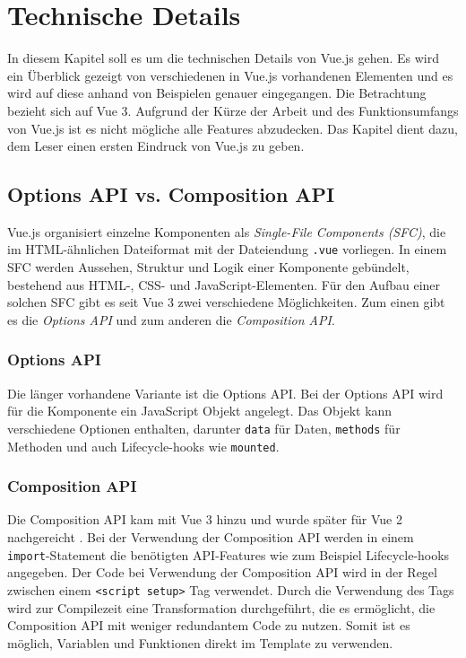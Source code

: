 

\chapter{Technische Details}\label{ch:technische-details}
In diesem Kapitel soll es um die technischen Details von Vue.js gehen.
Es wird ein Überblick gezeigt von verschiedenen in Vue.js vorhandenen Elementen
und es wird auf diese anhand von Beispielen genauer eingegangen.
Die Betrachtung bezieht sich auf Vue 3.
Aufgrund der Kürze der Arbeit und des Funktionsumfangs von Vue.js ist es nicht mögliche alle Features abzudecken.
Das Kapitel dient dazu, dem Leser einen ersten Eindruck von Vue.js zu geben.


\section{Options API vs. Composition API}\label{sec:options-api-and-composition-api}
Vue.js organisiert einzelne Komponenten als \emph{Single-File Components (SFC)},
die im HTML-ähnlichen Dateiformat mit der Dateiendung \texttt{.vue} vorliegen.
In einem SFC werden Aussehen, Struktur und Logik einer Komponente gebündelt, bestehend aus HTML-, CSS- und JavaScript-Elementen.
Für den Aufbau einer solchen SFC gibt es seit Vue 3 zwei verschiedene Möglichkeiten.
Zum einen gibt es die \emph{Options API} und zum anderen die \emph{Composition API}. \cite{vueIntroduction}

\subsection*{Options API}
Die länger vorhandene Variante ist die Options API.
Bei der Options API wird für die Komponente ein JavaScript Objekt angelegt.
Das Objekt kann verschiedene Optionen enthalten, darunter \texttt{data} für Daten, \texttt{methods} für Methoden und auch Lifecycle-hooks wie \texttt{mounted}.
\cite{vueIntroduction}

\subsection*{Composition API}
Die Composition API kam mit Vue 3 hinzu und wurde später für Vue 2 nachgereicht \cite{vueFAQ}.
Bei der Verwendung der Composition API werden in einem \texttt{import}-Statement
die benötigten API-Features wie zum Beispiel Lifecycle-hooks angegeben.
Der Code bei Verwendung der Composition API wird in der Regel zwischen einem \texttt{<script setup>} Tag verwendet.
Durch die Verwendung des Tags wird zur Compilezeit eine Transformation durchgeführt,
die es ermöglicht, die Composition API mit weniger redundantem Code zu nutzen.
Somit ist es möglich, Variablen und Funktionen direkt im Template zu verwenden.
\cite{vueIntroduction}

